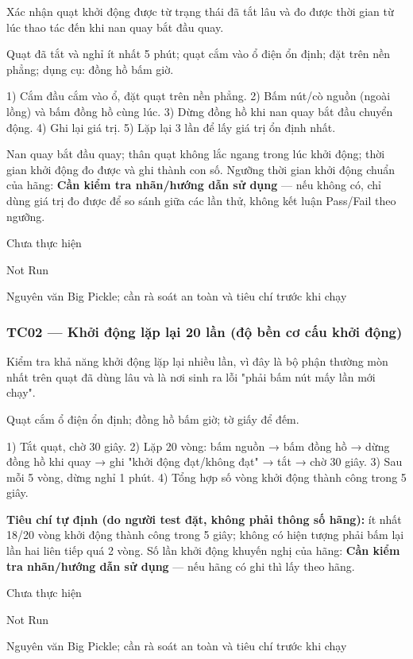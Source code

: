 \begin{description}
\tightlist
\item[Objective]
Xác nhận quạt khởi động được từ trạng thái đã tắt lâu và đo được thời gian từ lúc thao tác đến khi nan quay bắt đầu quay.
\item[Input]
Quạt đã tắt và nghỉ ít nhất 5 phút; quạt cắm vào ổ điện ổn định; đặt trên nền phẳng; dụng cụ: đồng hồ bấm giờ.
\item[Steps]
1) Cắm đầu cắm vào ổ, đặt quạt trên nền phẳng. 2) Bấm nút/cò nguồn (ngoài lồng) và bấm đồng hồ cùng lúc. 3) Dừng đồng hồ khi nan quay bắt đầu chuyển động. 4) Ghi lại giá trị. 5) Lặp lại 3 lần để lấy giá trị ổn định nhất.
\item[Expected]
Nan quay bắt đầu quay; thân quạt không lắc ngang trong lúc khởi động; thời gian khởi động đo được và ghi thành con số. Ngưỡng thời gian khởi động chuẩn của hãng: \textbf{Cần kiểm tra nhãn/hướng dẫn sử dụng} --- nếu không có, chỉ dùng giá trị đo được để so sánh giữa các lần thử, không kết luận Pass/Fail theo ngưỡng.
\item[Actual]
Chưa thực hiện
\item[Verdict]
Not Run
\item[Ghi chú rà soát]
Nguyên văn Big Pickle; cần rà soát an toàn và tiêu chí trước khi chạy
\end{description}

\subsubsection{TC02 --- Khởi động lặp lại 20 lần (độ bền cơ cấu khởi động)}\label{tc02-khux1edfi-ux111ux1ed9ng-lux1eb7p-lux1ea1i-20-lux1ea7n-ux111ux1ed9-bux1ec1n-cux1a1-cux1ea5u-khux1edfi-ux111ux1ed9ng}

\begin{description}
\tightlist
\item[Objective]
Kiểm tra khả năng khởi động lặp lại nhiều lần, vì đây là bộ phận thường mòn nhất trên quạt đã dùng lâu và là nơi sinh ra lỗi "phải bấm nút mấy lần mới chạy".
\item[Input]
Quạt cắm ổ điện ổn định; đồng hồ bấm giờ; tờ giấy để đếm.
\item[Steps]
1) Tắt quạt, chờ 30 giây. 2) Lặp 20 vòng: bấm nguồn → bấm đồng hồ → dừng đồng hồ khi quay → ghi "khởi động đạt/không đạt" → tắt → chờ 30 giây. 3) Sau mỗi 5 vòng, dừng nghỉ 1 phút. 4) Tổng hợp số vòng khởi động thành công trong 5 giây.
\item[Expected]
\textbf{Tiêu chí tự định (do người test đặt, không phải thông số hãng):} ít nhất 18/20 vòng khởi động thành công trong 5 giây; không có hiện tượng phải bấm lại lần hai liên tiếp quá 2 vòng. Số lần khởi động khuyến nghị của hãng: \textbf{Cần kiểm tra nhãn/hướng dẫn sử dụng} --- nếu hãng có ghi thì lấy theo hãng.
\item[Actual]
Chưa thực hiện
\item[Verdict]
Not Run
\item[Ghi chú rà soát]
Nguyên văn Big Pickle; cần rà soát an toàn và tiêu chí trước khi chạy
\end{description}

